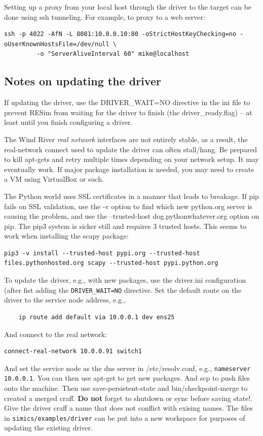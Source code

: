 \documentclass[titlepage]{article}
\begin{document}
\begin{appendices}
Setting up a proxy from your local host through the driver to the target can be done using ssh tunneling.  For example, to proxy to a web server:
\begin{verbatim}
ssh -p 4022 -AfN -L 8081:10.0.0.10:80 -oStrictHostKeyChecking=no -oUserKnownHostsFile=/dev/null \
         -o "ServerAliveInterval 60" mike@localhost
\end{verbatim}

\subsection{Notes on updating the driver}
If updating the driver, use the DRIVER\_WAIT=NO directive in the ini file to prevent RESim from waiting for the driver to finish 
(the driver\_ready.flag) -- at least until you finish configuring a driver.

The Wind River \textit{real network} interfaces are not entirely stable, as a result, the real-network connect used to update the driver can often stall/hang.
Be prepared to kill apt-gets and retry multiple times depending on your network setup.  It may eventually work.  If major package installation is needed,
you may need to create a VM using VirtualBox or such.

The Python world uses SSL certificates in a manner that leads to breakage.  If pip fails on SSL validation, use the -v option
to find which new python.org server is causing the problem, and use the --trusted-host dog.pythonwhatever.org option on pip.
The pip3 system is sicker still and requires 3 trusted hosts.  This seems to work when installing the scapy package:
\begin{verbatim}
pip3 -v install --trusted-host pypi.org --trusted-host files.pythonhosted.org scapy --trusted-host pypi.python.org
\end{verbatim}

To update the driver, e.g., with new packages, use the driver.ini configuration (after fist adding the {\tt DRIVER\_WAIT=NO} directive.  
Set the default route on the driver to the service node address, e.g.,
\begin{verbatim}
    ip route add default via 10.0.0.1 dev ens25
\end{verbatim}
And connect to the real network:
\begin{verbatim}
connect-real-network 10.0.0.91 switch1
\end{verbatim}
And set the service node as the dns server in /etc/resolv.conf, e.g.,  {\tt nameserver 10.0.0.1}.
You can then use apt-get to get new packages.  And scp to push files onto the machine.  Then use save-persistent-state and bin/checkpoint-merge to
created a merged craff.  \textbf{Do not} forget to shutdown or sync before saving state!.  Give the driver craff a name that does not conflict with exising names.
The files in {\tt simics/examples/driver} can be put into a new workspace for purposes of updating the existing driver.


\end{appendices}
\end{document}

